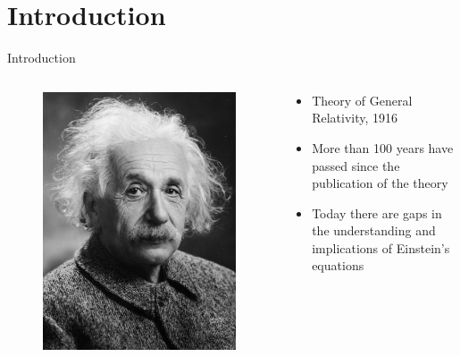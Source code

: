 \documentclass[handout]{beamer}
\begin{document}
\section{Introduction}
\begin{frame}{Introduction}
	\begin{columns}
		\begin{column}{0.5\textwidth}
			\begin{figure}[h]
				\centering
				\includegraphics[width=0.9\linewidth]{images/Albert_Einstein_Head}
			\end{figure}
		\end{column}
		\begin{column}{0.5\textwidth}
			\begin{itemize}
				\item Theory of General Relativity, 1916
				\item More than 100 years have passed since the publication of the theory
				\item Today there are gaps in the understanding and implications of Einstein's equations
			\end{itemize}
		\end{column}
	\end{columns}
\end{frame}
\end{document}
